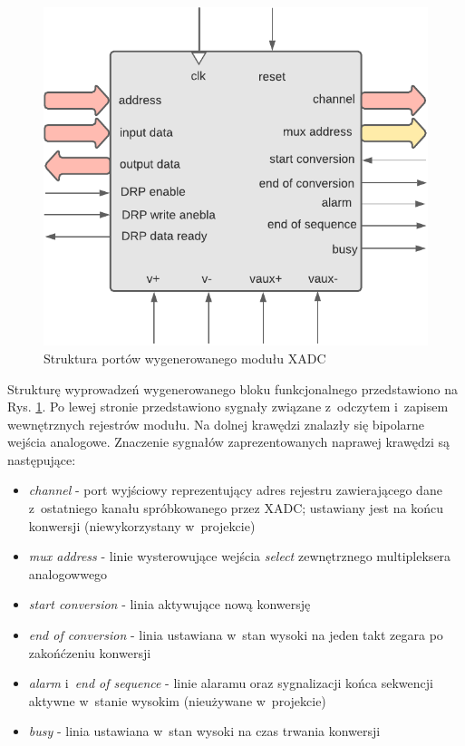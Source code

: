 \vspace{0.5cm}
\begin{figure}[ht]
    \centering
    \includegraphics[scale=0.8]{img/diagrams/xadc.pdf}
    \captionsetup{format=plain,justification=centering}
    \caption{Struktura portów wygenerowanego modułu XADC}
    \label{xadc-structure}
\end{figure}
\vspace{0.5cm}

Strukturę wyprowadzeń wygenerowanego bloku funkcjonalnego przedstawiono na Rys. \ref{xadc-structure}. Po lewej stronie przedstawiono sygnały związane z~odczytem i~zapisem wewnętrznych rejestrów modułu. Na dolnej krawędzi znalazły się bipolarne wejścia analogowe. Znaczenie sygnałów zaprezentowanych naprawej krawędzi są następujące:

\begin{itemize}
    \item \textit{channel} - port wyjściowy reprezentujący adres rejestru zawierającego dane z~ostatniego kanału spróbkowanego przez XADC; ustawiany jest na końcu konwersji (niewykorzystany w~projekcie)
    \item \textit{mux address} - linie wysterowujące wejścia \textit{select} zewnętrznego multipleksera analogowwego
    \item \textit{start conversion} - linia aktywujące nową konwersję
    \item \textit{end of conversion} - linia ustawiana w~stan wysoki na jeden takt zegara po zakońćzeniu konwersji
    \item \textit{alarm} i~\textit{end of sequence} - linie alaramu oraz sygnalizacji końca sekwencji aktywne w~stanie wysokim (nieużywane w~projekcie)
    \item \textit{busy} - linia ustawiana w~stan wysoki na czas trwania konwersji
\end{itemize}

